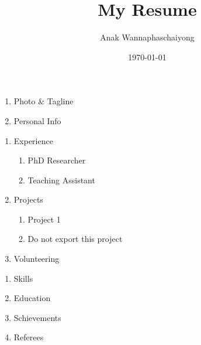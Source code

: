 \documentclass[10pt,a4paper,ragged2e,withhyper]{altacv}
\author{Anak Wannaphaschaiyong}
\date{\today}
\title{My Resume}
\begin{document}
\label{sec:org552aac1}
\begin{enumerate}
\item Photo \& Tagline
\label{sec:orgf56312b}
\item Personal Info
\label{sec:orge627474}
\makecvheader
\end{enumerate}
\label{sec:orgf23d688}
\begin{enumerate}
\item Experience
\label{sec:orga5d2c58}
\begin{enumerate}
\item PhD Researcher
\label{sec:org1bbc0f1}
\item Teaching Assistant
\label{sec:org7d6df89}
\end{enumerate}
\item Projects
\label{sec:orgf2d0250}
\begin{enumerate}
\item Project 1
\label{sec:org846a85a}
\item Do not export this project
\label{sec:orga72e18c}
\end{enumerate}
\item Volunteering
\label{sec:orgd24e0cc}
\end{enumerate}
\label{sec:org0990c8d}
\begin{enumerate}
\item Skills
\label{sec:org65cc562}
\item Education
\label{sec:orgfc858cc}
\item Schievements
\label{sec:orgcc0d8ed}
\item Referees
\label{sec:org577f276}
\end{enumerate}
\label{sec:orgb715380}
\end{document}

